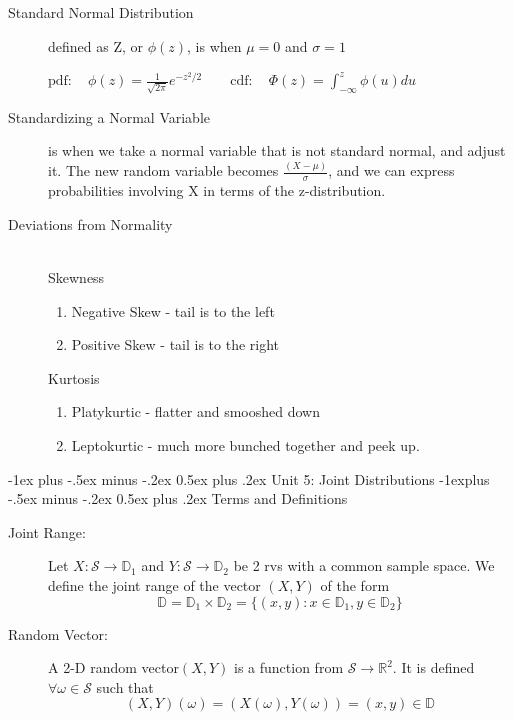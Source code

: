 \documentclass[10pt,landscape]{article}
\makeatletter
\renewcommand{\section}{\@startsection{section}{1}{0mm}%
                                {-1ex plus -.5ex minus -.2ex}%
                                {0.5ex plus .2ex}%
                                {\normalfont\large\bfseries}}
\renewcommand{\subsection}{\@startsection{subsection}{2}{0mm}%
                                {-1explus -.5ex minus -.2ex}%
                                {0.5ex plus .2ex}%
                                {\normalfont\normalsize\bfseries}}
\makeatother
\begin{document}
\begin{multicols}{3}
\begin{description}
  \item[Standard Normal Distribution] defined as Z, or $\phi(z)$, is when $\mu=0$ and $\sigma=1$
  \begin{center}
    $\text{pdf}:  \quad \phi(z) = \frac{1}{\sqrt{2 \pi}} e^{-z^{2}/2} \qquad \text{cdf}: \quad  \Phi(z) = \int_{-\infty}^{z} \phi(u) du$
  \end{center}
  \item[Standardizing a Normal Variable] is when we take a normal variable that is not standard normal, and adjust it. The new random variable becomes $\frac{(X-\mu)}{\sigma}$, and we can express probabilities involving X in terms of the z-distribution.
  \item[Deviations from Normality] \quad \\
  Skewness
  \begin{enumerate}
    \item Negative Skew - tail is to the left
    \item Positive Skew - tail is to the right
  \end{enumerate}
  Kurtosis
  \begin{enumerate}
    \item Platykurtic - flatter and smooshed down
    \item Leptokurtic - much more bunched together and peek up.
  \end{enumerate}
  
\end{description}

\section{Unit 5: Joint Distributions}
	\subsection{Terms and Definitions}
\begin{description}
  \item[Joint Range:] Let $X:\mathcal{S} \to \mathbb{D}_1$ and $Y:\mathcal{S} \to \mathbb{D}_2$ be 2 rvs with a common sample space. We define the joint range of the vector $(X,Y)$ of the form
$$  \mathbb{D} = \mathbb{D}_1 \times \mathbb{D}_2 = \{ (x,y): x \in \mathbb{D}_1, y \in \mathbb{D}_2\} $$

  \item[Random Vector:] A 2-D random vector$(X,Y)$ is a function from $\mathcal{S} \to \mathbb{R}^2$.  It is defined $\forall \omega \in \mathcal{S}$ such that $$ (X,Y)(\omega) = (X(\omega), Y(\omega)) = (x,y) \in \mathbb{D}$$
  

\end{description}
\end{multicols}
\end{document}
